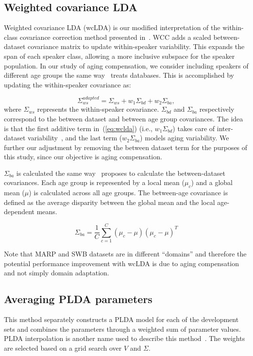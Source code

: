 \documentclass[a4paper]{article}
\begin{document}
\subsection{Weighted covariance LDA}
Weighted covariance LDA (wcLDA) is our modified interpretation of the within-class covariance correction method presented in~\cite{weightedLDA}. WCC adds a scaled between-dataset covariance matrix to update within-speaker variability. This expands the span of each speaker class, allowing a more inclusive subspace for the speaker population. In our study of aging compensation, we consider including speakers of different age groups the same way~\cite{weightedLDA} treats databases. This is accomplished by updating the within-speaker covariance as:

\begin{equation}
\label{eq:wclda}
\Sigma_{ws}^{adapted} = \Sigma_{ws} + w_1\Sigma_{bd} + w_2\Sigma_{ba},
\end{equation}
where $\Sigma_{ws}$ represents the within-speaker covariance. $\Sigma_{bd}$ and $\Sigma_{ba}$ respectively correspond to the between dataset and between age group covariances. The idea is that the first additive term in~(\ref{eq:wclda}) (i.e., $w_1\Sigma_{bd}$) takes care of inter-dataset variability~\cite{misra2016odyssey}, and the last term ($w_2\Sigma_{ba}$) models aging variability. We further our adjustment by removing the between dataset term for the purposes of this study, since our objective is aging compensation.  

$\Sigma_{ba}$ is calculated the same way~\cite{weightedLDA} proposes to calculate the between-dataset covariances. Each age group is represented by a local mean ($\mu_c$) and a global mean ($\mu$) is calculated across all age groups. The between-age covariance is defined as the average disparity between the global mean and the local age-dependent means. 

\begin{equation}
\Sigma_{ba} = \frac{1}{C}\sum_{c=1}^{C}(\mu_c - \mu)(\mu_c - \mu)^T
\end{equation}

Note that MARP and SWB datasets are in different ``domains'' and therefore the potential performance improvement with wcLDA is due to aging compensation and not simply domain adaptation.

\subsection{Averaging PLDA parameters}
This method separately constructs a PLDA model for each of the development sets and combines the parameters through a weighted sum of parameter values. PLDA interpolation is another name used to describe this method~\cite{garcia2014supervised}. The weights are selected based on a grid search over $V$ and $\Sigma$. 
\end{document}
